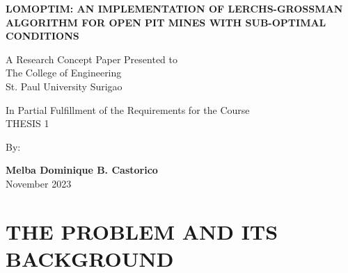 \documentclass[12pt]{report}
\newcommand{\authora}{
    Melba Dominique B. Castorico %
}
\newcommand{\thetitle}{LOMOPTIM: An Implementation of Lerchs-Grossman Algorithm for Open Pit Mines with Sub-Optimal Conditions}
\begin{document}
\thispagestyle{empty}

\begin{center}

\textbf{\MakeUppercase{\thetitle}}

\vspace{1.5cm}
A Research Concept Paper Presented to \\
The College of Engineering \\
St. Paul University Surigao

\vfill

In Partial Fulfillment of the Requirements for the Course \\
THESIS 1

\vspace{1cm}
By:

\vspace{1cm}
\textbf{\authora} \\

\vspace{1cm}
November 2023

\end{center}


\pagestyle{fancy}
\fancyhead{}
\fancyfoot{}
\fancyhead[R]{\thepage}

\tableofcontents


\chapter{THE PROBLEM AND ITS BACKGROUND}
\end{document}
